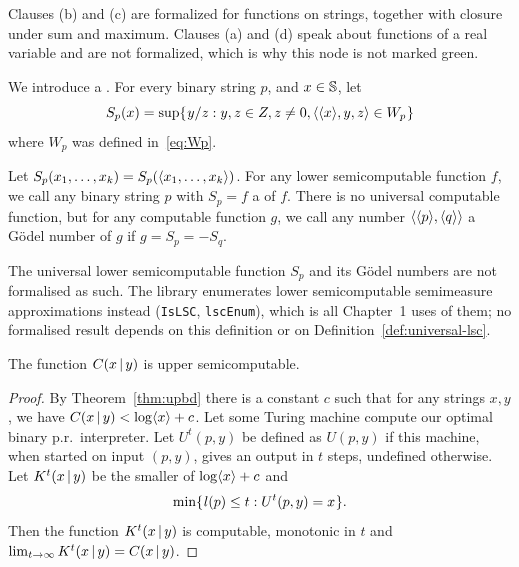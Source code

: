 \begin{formalization}
Clauses (b) and (c) are formalized for functions on strings, together with closure under sum and maximum. Clauses (a) and (d) speak about functions of a real variable and are not formalized, which is why this node is not marked green.
\end{formalization}

 \begin{definition}
  \label{def:universal-lsc}
We introduce a . 
For every binary string \( p \), and \( x \in \mathbb{S} \), let
 \[ 
  S_{p}(x)= \sup\mathopen\{\mskip 1mu y/z : y,z\in Z, z \not = 0, 
	{\mathopen\langle {\mathopen\langle  x \mathclose\rangle} ,y,z \mathclose\rangle}  \in W_{p} \mskip 1mu\mathclose\}
 \]
where \( W_{p} \) was defined in~\eqref{eq:Wp}.  
 \end{definition}

 \begin{definition}
  \label{def:lsc-tuples}
Let \( S_{p}(x_{1},\ldots,x_{k})= S_{p}({\mathopen\langle  x_{1},\ldots,x_{k} \mathclose\rangle} ) \).  
For any lower semicomputable function \( f \), we call any binary string \( p \) with
\( S_{p}=f \) a  of \( f \). 
There is no universal computable function, but for any computable 
function \( g \), we call any number \(  \mathopen\langle   \mathopen\langle  p \mathclose\rangle , \mathopen\langle  q \mathclose\rangle \mathclose\rangle  \) 
a G\"odel number of \( g \) if \( g=S_{p}=-S_{q} \).
 \end{definition}
\begin{formalization}
The universal lower semicomputable function $S_p$ and its G\"odel numbers are not formalised as such. The library enumerates lower semicomputable semimeasure approximations instead (\texttt{IsLSC}, \texttt{lscEnum}), which is all Chapter~1 uses of them; no formalised result depends on this definition or on Definition~\ref{def:universal-lsc}.
\end{formalization}


\begin{theorem}
  \leanok
  	      \label{thm:Ksemicp}
 The function \( C(x \,\vert\, y) \) is upper semicomputable.
 \end{theorem}

\begin{proof}
  \leanok
 By Theorem~\ref{thm:upbd} there is a constant \( c \) such that for
any strings \( x,y \), we have \( C(x \,\vert\, y) < \log \mathopen\langle   x  \mathclose\rangle  + c \).  
Let some Turing machine compute our optimal binary p.r.~interpreter. 
Let \( U^{t}(p,y) \) be defined as \( U(p,y) \) if this machine, when started on
input \( (p,y) \), gives an output in \( t \) steps, undefined otherwise. 
Let \( K^{t}(x \,\vert\, y) \) be the smaller of \( \log  \mathopen\langle   x  \mathclose\rangle  + c \) and 
 \[  
   \min\mathopen\{\mskip 1mu l(p) \le t : U^{t}(p,y)=x \mskip 1mu\mathclose\}.
 \]
Then the function \( K^{t}(x \,\vert\, y) \) is computable, monotonic in \( t \) and 
\( \lim_{t\to\infty} K^{t}(x \,\vert\, y) = C(x \,\vert\, y) \). 
 \end{proof}

